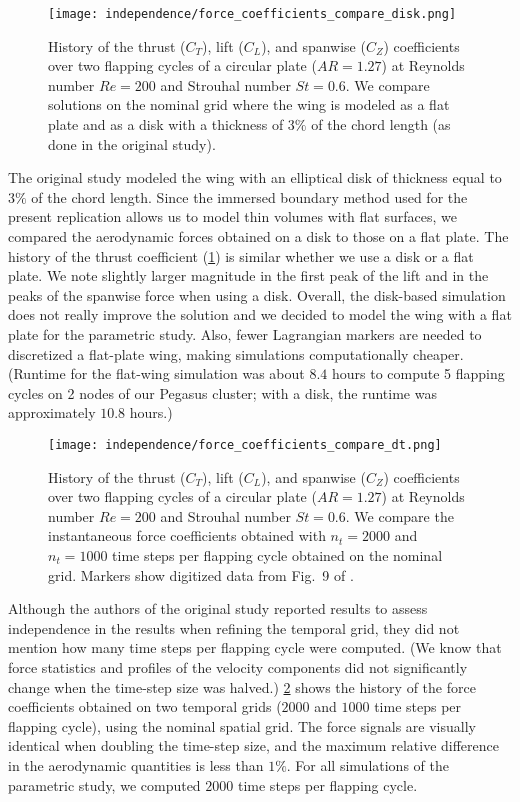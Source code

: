 \begin{figure}[!h]
  \centering
  \texttt{[image: independence/force\_coefficients\_compare\_disk.png]}
  \caption{History of the thrust ($C_T$), lift ($C_L$), and spanwise ($C_Z$) coefficients over two flapping cycles of a circular plate ($AR = 1.27$) at Reynolds number $Re = 200$ and Strouhal number $St = 0.6$. We compare solutions on the nominal grid where the wing is modeled as a flat plate and as a disk with a thickness of $3\%$ of the chord length (as done in the original study\supercite{li_dong_2016}).}
  \label{fig:independence_force_coefficients_disk}
\end{figure}

The original study modeled the wing with an elliptical disk of thickness equal to $3\%$ of the chord length.
Since the immersed boundary method used for the present replication allows us to model thin volumes with flat surfaces,
we compared the aerodynamic forces obtained on a disk to those on a flat plate.
The history of the thrust coefficient (\cref{fig:independence_force_coefficients_disk}) is similar whether we use a disk or a flat plate.
We note slightly larger magnitude in the first peak of the lift and in the peaks of the spanwise force when using a disk.
Overall, the disk-based simulation does not really improve the solution and we decided to model the wing with a flat plate for the parametric study.
Also, fewer Lagrangian markers are needed to discretized a flat-plate wing, making simulations computationally cheaper.
(Runtime for the flat-wing simulation was about $8.4$ hours to compute 5 flapping cycles on 2 nodes of our Pegasus cluster; with a disk, the runtime was approximately $10.8$ hours.)

\begin{figure}[!h]
  \centering
  \texttt{[image: independence/force\_coefficients\_compare\_dt.png]}
  \caption{History of the thrust ($C_T$), lift ($C_L$), and spanwise ($C_Z$) coefficients over two flapping cycles of a circular plate ($AR = 1.27$) at Reynolds number $Re = 200$ and Strouhal number $St = 0.6$. We compare the instantaneous force coefficients obtained with $n_t = 2000$ and $n_t = 1000$ time steps per flapping cycle obtained on the nominal grid. Markers show digitized data from Fig.~9 of \citet{li_dong_2016}.}
  \label{fig:independence_force_coefficients_dt}
\end{figure}

Although the authors of the original study reported results to assess independence in the results when refining the temporal grid, they did not mention how many time steps per flapping cycle were computed.
(We know that force statistics and profiles of the velocity components did not significantly change when the time-step size was halved.)
\cref{fig:independence_force_coefficients_dt} shows the history of the force coefficients obtained on two temporal grids ($2000$ and $1000$ time steps per flapping cycle), using the nominal spatial grid.
The force signals are visually identical when doubling the time-step size, and the maximum relative difference in the aerodynamic quantities is less than $1\%$.
For all simulations of the parametric study, we computed $2000$ time steps per flapping cycle.

